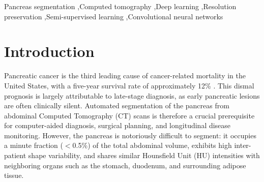 \documentclass[review,authoryear]{elsarticle}
\begin{document}
\begin{frontmatter}
\begin{abstract}
\textbf{Results:} Our patch-based CNN achieves $0.809 \pm 0.015$ Dice (four independent runs, peak 0.849) on MSD Task07\_Pancreas, competitive with nnU-Net (0.823) and dramatically outperforming SAM (0.705 with GT bounding box prompts) and MedSAM (0.439). Downsampling to $256 \times 256$ or $128 \times 128$ causes IoU collapse from 0.69 to $\sim$0.31. Fourier analysis confirms a 38\% loss in boundary edge strength at $128 \times 128$. Uncertainty-aware Mean Teacher (UA-MT) with 50\% labels recovers 99.3\% of supervised performance, and outperforms the fully supervised model on 80 external TCIA volumes (0.603 vs.\ 0.544 Dice).

\textbf{Conclusions:} For small-organ segmentation, preserving native spatial resolution is more critical than architectural complexity. Data-centric strategies with lightweight CNNs outperform foundation models and are competitive with self-configuring frameworks, while SSL provides superior annotation efficiency and domain generalization.
\end{abstract}

\begin{keyword}
Pancreas segmentation \sep Computed tomography \sep Deep learning \sep Resolution preservation \sep Semi-supervised learning \sep Convolutional neural networks
\end{keyword}

\end{frontmatter}

\linenumbers

\section{Introduction}
Pancreatic cancer is the third leading cause of cancer-related mortality in the United States, with a five-year survival rate of approximately 12\% \cite{Cancerstatistics2023}. This dismal prognosis is largely attributable to late-stage diagnosis, as early pancreatic lesions are often clinically silent. Automated segmentation of the pancreas from abdominal Computed Tomography (CT) scans is therefore a crucial prerequisite for computer-aided diagnosis, surgical planning, and longitudinal disease monitoring. However, the pancreas is notoriously difficult to segment: it occupies a minute fraction ($<$0.5\%) of the total abdominal volume, exhibits high inter-patient shape variability, and shares similar Hounsfield Unit (HU) intensities with neighboring organs such as the stomach, duodenum, and surrounding adipose tissue.
\end{document}

